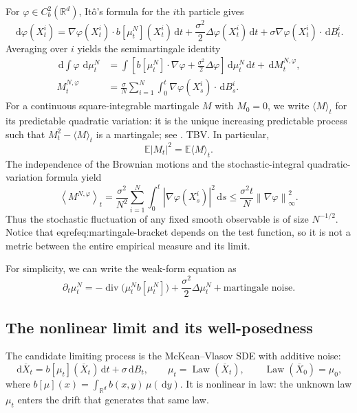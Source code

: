 \documentclass[11pt]{amsart}
\numberwithin{equation}{section}
\theoremstyle{plain}
\newcommand{\R}{\mathbb{R}}
\newcommand{\E}{\mathbb{E}}
\newcommand{\dd}{\,\mathrm{d}}
\newcommand{\abs}[1]{\left\lvert#1\right\rvert}
\newcommand{\norm}[1]{\left\lVert#1\right\rVert}
\DeclareMathOperator{\Law}{Law}
\DeclareMathOperator{\diver}{div}
\begin{document}
For $\varphi\in C_b^2(\R^d)$, It\^o's formula for the $i$th particle gives
\[
 \dd\varphi(X_t^i)
 =\nabla\varphi(X_t^i)\cdot b[\mu_t^N](X_t^i)\dd t
 +\frac{\sigma^2}{2}\Delta\varphi(X_t^i)\dd t
 +\sigma\nabla\varphi(X_t^i)\cdot\dd B_t^i.
\]
Averaging over $i$ yields the semimartingale identity
\begin{align}
    \dd\int\varphi\,\dd\mu_t^N
    &=\int\left[b[\mu_t^N]\cdot\nabla\varphi
       +\frac{\sigma^2}{2}\Delta\varphi\right]\dd\mu_t^N\dd t
       +\dd M_t^{N,\varphi},\label{eq:empirical-weak}\\
    M_t^{N,\varphi}
    &=\frac{\sigma}{N}\sum_{i=1}^N
      \int_0^t\nabla\varphi(X_s^i)\cdot\dd B_s^i.
      \label{eq:empirical-martingale}
\end{align}
For a continuous square-integrable martingale $M$ with $M_0=0$, we write
$\langle M\rangle_t$ for its predictable quadratic variation: it is the unique increasing predictable process such that
$M_t^2-\langle M\rangle_t$ is a martingale; see \cite[Chapter~3]{KaratzasShreve1991}. TBV. 
In particular,
\[
 \E\abs{M_t}^2=\E\langle M\rangle_t.
\]
The independence of the Brownian motions and the stochastic-integral
quadratic-variation formula yield
\begin{equation}\label{eq:martingale-bracket}
  \left\langle M^{N,\varphi}\right\rangle_t
  =\frac{\sigma^2}{N^2}\sum_{i=1}^N
    \int_0^t\abs{\nabla\varphi(X_s^i)}^2\dd s
  \leq\frac{\sigma^2t}{N}\norm{\nabla\varphi}_\infty^2.
\end{equation}
Thus the stochastic fluctuation of any fixed smooth observable is of size
$N^{-1/2}$.  Notice that eqref{eq:martingale-bracket} depends on the test function, so it is not a metric between the entire empirical measure and its limit.

For simplicity, we can write the weak-form equation as
\[
 \partial_t \mu_t^N = -\diver\bigl(\mu_t^N b[\mu_t^N]\bigr)  + \frac{\sigma^2}{2} \Delta \mu_t^N + \text{martingale noise}.
\]

\subsection{The nonlinear limit and its well-posedness}
The candidate limiting process is the McKean--Vlasov SDE with additive noise:
\begin{equation}\label{eq:mv-sde}
  \dd\overline X_t=b[\mu_t](\overline X_t)\dd t+\sigma\dd B_t,
  \qquad \mu_t=\Law(\overline X_t),\qquad
  \Law(\overline X_0)=\mu_0, 
\end{equation}
where $ b[\mu](x)=\int_{\R^d}b(x,y)\,\mu(\dd y)$. 
It is nonlinear in law: the unknown law $\mu_t$ enters the drift that generates that same law. 
\end{document}
